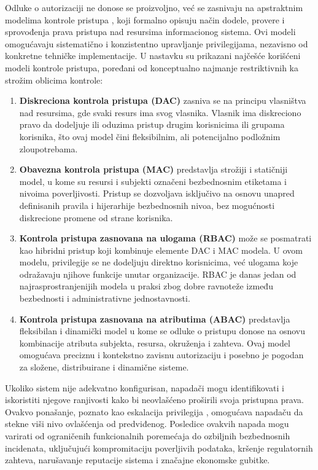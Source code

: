 Odluke o autorizaciji ne donose se proizvoljno, već se zasnivaju na apstraktnim modelima kontrole pristupa \cite{sandhu2002access}, koji formalno opisuju način dodele, provere i sprovođenja prava pristupa nad resursima informacionog sistema. Ovi modeli omogućavaju sistematično i konzistentno upravljanje privilegijama, nezavisno od konkretne tehničke implementacije. U nastavku su prikazani najčešće korišćeni modeli kontrole pristupa, poređani od konceptualno najmanje restriktivnih ka strožim oblicima kontrole:
\begin{enumerate}
\item \textbf{Diskreciona kontrola pristupa (DAC)} zasniva se na principu vlasništva nad resursima, gde svaki resurs ima svog vlasnika. Vlasnik ima diskreciono pravo da dodeljuje ili oduzima pristup drugim korisnicima ili grupama korisnika, što ovaj model čini fleksibilnim, ali potencijalno podložnim zloupotrebama.
\item \textbf{Obavezna kontrola pristupa (MAC)} predstavlja strožiji i statičniji model, u kome su resursi i subjekti označeni bezbednosnim etiketama i nivoima poverljivosti. Pristup se dozvoljava isključivo na osnovu unapred definisanih pravila i hijerarhije bezbednosnih nivoa, bez mogućnosti diskrecione promene od strane korisnika.
\item \textbf{Kontrola pristupa zasnovana na ulogama (RBAC)} može se posmatrati kao hibridni pristup koji kombinuje elemente DAC i MAC modela. U ovom modelu, privilegije se ne dodeljuju direktno korisnicima, već ulogama koje odražavaju njihove funkcije unutar organizacije. RBAC je danas jedan od najrasprostranjenijih modela u praksi zbog dobre ravnoteže između bezbednosti i administrativne jednostavnosti.
\item \textbf{Kontrola pristupa zasnovana na atributima (ABAC)} predstavlja fleksibilan i dinamički model u kome se odluke o pristupu donose na osnovu kombinacije atributa subjekta, resursa, okruženja i zahteva. Ovaj model omogućava preciznu i kontekstno zavisnu autorizaciju i posebno je pogodan za složene, distribuirane i dinamične sisteme.
\end{enumerate}

Ukoliko sistem nije adekvatno konfigurisan, napadači mogu identifikovati i iskoristiti njegove ranjivosti kako bi neovlašćeno proširili svoja pristupna prava. Ovakvo ponašanje, poznato kao eskalacija privilegija \cite{provos2003preventing} , omogućava napadaču da stekne viši nivo ovlašćenja od predviđenog. Posledice ovakvih napada mogu varirati od ograničenih funkcionalnih poremećaja do ozbiljnih bezbednosnih incidenata, uključujući kompromitaciju poverljivih podataka, kršenje regulatornih zahteva, narušavanje reputacije sistema i značajne ekonomske gubitke.

